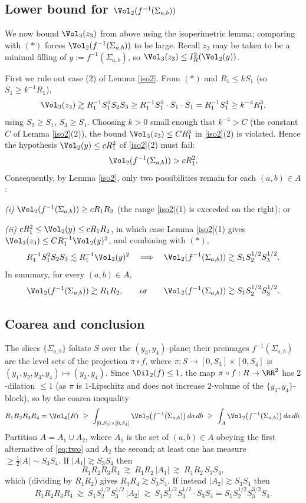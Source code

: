 \subsection*{Lower bound for $\Vol_2(f^{-1}(\Sigma_{a,b}))$}
We now bound $\Vol_3(z_3)$ from above using the isoperimetric lemma; comparing with $(\ast)$ forces $\Vol_2(f^{-1}(\Sigma_{a,b}))$ to be large. Recall $z_3$ may be taken to be a minimal filling of $y:=f^{-1}(\Sigma_{a,b})$, so $\Vol_3(z_3)\le I_R^2(\Vol_2(y))$.

First we rule out case (2) of Lemma \ref{iso2}. From $(\ast)$ and $R_1\le kS_1$ (so $S_1\ge k^{-1}R_1$),
\[
\Vol_3(z_3)\gtrsim R_1^{-1}S_1^2S_2S_3\ge R_1^{-1}S_1^2\cdot S_1\cdot S_1 = R_1^{-1}S_1^4\ge k^{-4}R_1^3,
\]
using $S_2\ge S_1$, $S_3\ge S_1$. Choosing $k>0$ small enough that $k^{-4}>C$ (the constant $C$ of Lemma \ref{iso2}(2)), the bound $\Vol_3(z_3)\le CR_1^3$ in \eqref{iso2}(2) is violated. Hence the hypothesis $\Vol_2(y)\le cR_1^2$ of \eqref{iso2}(2) must fail:
\[
\Vol_2(f^{-1}(\Sigma_{a,b}))> cR_1^2 .
\]
Consequently, by Lemma \ref{iso2}, only two possibilities remain for each $(a,b)\in A$:

\emph{(i)} $\Vol_2(f^{-1}(\Sigma_{a,b}))\ge cR_1R_2$ (the range \eqref{iso2}(1) is exceeded on the right); or

\emph{(ii)} $cR_1^2\le\Vol_2(y)\le cR_1R_2$, in which case Lemma \ref{iso2}(1) gives $\Vol_3(z_3)\le CR_1^{-1}\Vol_2(y)^2$, and combining with $(\ast)$,
\[
R_1^{-1}S_1^2S_2S_3\lesssim R_1^{-1}\Vol_2(y)^2
\quad\Longrightarrow\quad
\Vol_2(f^{-1}(\Sigma_{a,b}))\gtrsim S_1S_2^{1/2}S_3^{1/2}.
\]
In summary, for every $(a,b)\in A$,
\begin{equation}\label{eq:two}
\Vol_2(f^{-1}(\Sigma_{a,b}))\gtrsim R_1R_2,
\qquad\text{or}\qquad
\Vol_2(f^{-1}(\Sigma_{a,b}))\gtrsim S_1S_2^{1/2}S_3^{1/2}.
\end{equation}

\subsection*{Coarea and conclusion}
The slices $\{\Sigma_{a,b}\}$ foliate $S$ over the $(y_3,y_4)$-plane; their preimages $f^{-1}(\Sigma_{a,b})$ are the level sets of the projection $\pi\circ f$, where $\pi:S\to[0,S_3]\times[0,S_4]$ is $(y_1,y_2,y_3,y_4)\mapsto(y_3,y_4)$. Since $\Dil_2(f)\le1$, the map $\pi\circ f:R\to\RR^2$ has $2$-dilation $\le1$ (as $\pi$ is $1$-Lipschitz and does not increase $2$-volume of the $\{y_3,y_4\}$-block), so by the coarea inequality
\[
R_1R_2R_3R_4=\Vol_4(R)\ \ge\ \int_{[0,S_3]\times[0,S_4]}\Vol_2\big(f^{-1}(\Sigma_{a,b})\big)\,da\,db
\ \ge\ \int_A \Vol_2\big(f^{-1}(\Sigma_{a,b})\big)\,da\,db .
\]
Partition $A=A_1\cup A_2$, where $A_1$ is the set of $(a,b)\in A$ obeying the first alternative of \eqref{eq:two} and $A_2$ the second; at least one has measure $\ge\frac12|A|\sim S_3S_4$. If $|A_1|\gtrsim S_3S_4$ then
\[
R_1R_2R_3R_4\ \gtrsim\ R_1R_2\,|A_1|\ \gtrsim\ R_1R_2\,S_3S_4,
\]
which (dividing by $R_1R_2$) gives $R_3R_4\gtrsim S_3S_4$. If instead $|A_2|\gtrsim S_3S_4$ then
\[
R_1R_2R_3R_4\ \gtrsim\ S_1S_2^{1/2}S_3^{1/2}\,|A_2|\ \gtrsim\ S_1S_2^{1/2}S_3^{1/2}\cdot S_3S_4
= S_1S_2^{1/2}S_3^{3/2}S_4 .
\]

